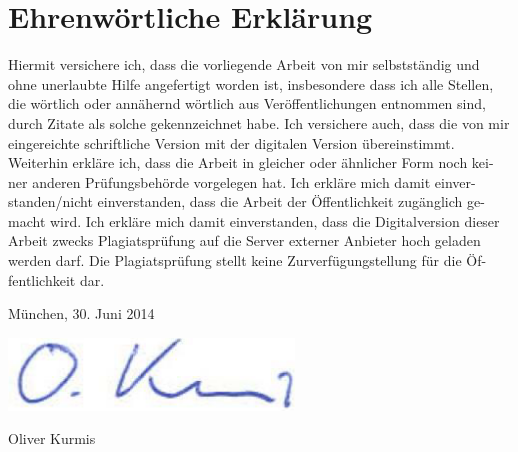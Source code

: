 \newpage

\thispagestyle{empty}

\section*{Ehrenwörtliche Erklärung}  
 
Hiermit  versichere  ich,  dass  die  vorliegende  Arbeit  von  mir  selbstständig  und 
ohne unerlaubte Hilfe angefertigt worden ist, insbesondere dass ich alle Stellen, 
die wörtlich oder annähernd wörtlich aus Veröffentlichungen entnommen sind, 
durch Zitate als solche gekennzeichnet habe. Ich versichere auch, dass die von 
mir  eingereichte  schriftliche  Version  mit  der  digitalen  Version  übereinstimmt. 
Weiterhin erkläre ich, dass die Arbeit in gleicher oder ähnlicher Form noch kei-
ner  anderen  Prüfungsbehörde  vorgelegen  hat.  Ich  erkläre  mich  damit  einver-
standen/nicht  einverstanden,  dass  die  Arbeit  der  Öffentlichkeit  zugänglich  ge-
macht wird. Ich erkläre mich damit einverstanden, dass die Digitalversion dieser 
Arbeit zwecks Plagiatsprüfung auf die Server externer Anbieter hoch geladen 
werden  darf.  Die  Plagiatsprüfung  stellt  keine  Zurverfügungstellung  für  die  Öf-
fentlichkeit dar.
 
München, 30. Juni 2014

\includegraphics[width=.2\textwidth]{img/unterschrift.png}

Oliver Kurmis  